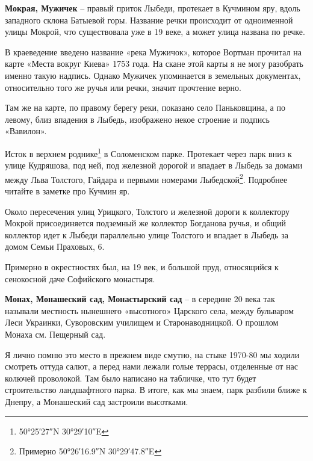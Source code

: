 \medskip

\textbf{Мокрая, Мужичек} – правый приток Лыбеди, протекает в Кучмином яру, вдоль западного склона Батыевой горы. Название речки происходит от одноименной улицы Мокрой, что существовала уже в 19 веке, а может улица названа по речке.

В краеведение введено название «река Мужичок», которое Вортман прочитал на карте «Места вокруг Киева» 1753 года. На скане этой карты я не могу разобрать именно такую надпись. Однако Мужичек упоминается в земельных документах, относительно того же ручья или речки, значит прочтение верно.

Там же на карте, по правому берегу реки, показано село Паньковщина, а по левому, близ впадения в Лыбедь, изображено некое строение и подпись «Вавилон».

Исток в верхнем роднике\footnote{50°25′27″N   30°29′10″E} в Соломенском парке. Протекает через парк вниз к улице Кудряшова, под ней, под железной дорогой и впадает в Лыбедь за домами между Льва Толстого, Гайдара и первыми номерами Лыбедской\footnote{Примерно 50°26′16.9″N 30°29′47.8″E}. Подробнее читайте в заметке про Кучмин яр.

Около пересечения улиц Урицкого, Толстого и железной дороги к коллектору Мокрой присоединяется подземный же коллектор Богданова ручья, и общий коллектор идет к Лыбеди параллельно улице Толстого и впадает в Лыбедь за домом Семьи Праховых, 6.




Примерно в окрестностях был, на 19 век, и большой пруд, относящийся к сенокосной даче Софийского монастыря.\\

\medskip




\textbf{Монах, Монашеский сад, Монастырский сад} – в середине 20 века так называли местность нынешнего «высотного» Царского села, между бульваром Леси Украинки, Суворовским училищем и Старонаводницкой. О прошлом Монаха см. Пещерный сад.

Я лично помню это место в прежнем виде смутно, на стыке 1970-80 мы ходили смотреть оттуда салют, а перед нами лежали голые террасы, отделенные от нас колючей проволокой. Там было написано на табличке, что тут будет строительство ландшафтного парка. В итоге, как мы знаем, парк разбили ближе к Днепру, а Монашеский сад застроили высотками. 

